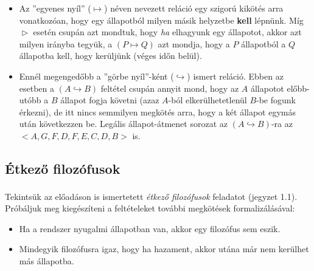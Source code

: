 \documentclass[12pt]{article}
\begin{document}
	\begin{itemize}
		\item Az ''egyenes nyíl'' ($\mapsto$) néven nevezett reláció egy szigorú kikötés arra vonatkozóan, hogy egy állapotból milyen másik helyzetbe \textbf{kell} lépnünk. Míg $\vartriangleright$ esetén csupán azt mondtuk, hogy \textit{ha} elhagyunk egy állapotot, akkor azt milyen irányba tegyük, a $(P \mapsto Q)$ azt mondja, hogy a $P$ állapotból a $Q$ állapotba kell, hogy kerüljünk (véges időn belül).
		\item Ennél megengedőbb a ''görbe nyíl''-ként ($\hookrightarrow$) ismert reláció. Ebben az esetben a $(A \hookrightarrow B)$ feltétel csupán annyit mond, hogy az $A$ állapotot előbb-utóbb a $B$ állapot fogja követni (azaz $A$-ból elkerülhetetlenül $B$-be fogunk érkezni), de itt nincs semmilyen megkötés arra, hogy a két állapot egymás után következzen be. Legális állapot-átmenet sorozat az $(A \hookrightarrow B)$-ra az $<A, G, F, D, F, E, C, D, B>$ is.
	\end{itemize}

\subsection{Étkező filozófusok}\label{etkezo-filo}
	Tekintsük az előadáson is ismertetett \textit{étkező filozófusok} feladatot (jegyzet\textsuperscript{\cite{orsi_jegyzet}} 1.1). Próbáljuk meg kiegészíteni a feltételeket további megkötések formalizálásával:
	\begin{itemize}
		\item Ha a rendszer nyugalmi állapotban van, akkor egy filozófus sem eszik.
		\item Mindegyik filozófusra igaz, hogy ha hazament, akkor utána már nem kerülhet más állapotba.
	\end{itemize}
\end{document}
